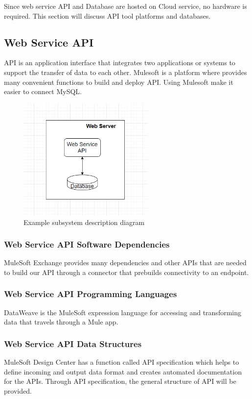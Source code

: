 Since web service API and  Database are hosted on Cloud service, no hardware is required. This section will discuss API tool platforms and databases.

\subsection{Web Service API}
API is an application interface that integrates two applications or systems to support the transfer of data to each other. Mulesoft is a platform where provides many convenient functions to build and deploy API. Using Mulesoft make it easier to connect MySQL.

\begin{figure}[h!]
	\centering
 	\includegraphics[width=0.60\textwidth]{images/web_layer.PNG}
 \caption{Example subsystem description diagram}
\end{figure}

\subsubsection{Web Service API Software Dependencies}
MuleSoft Exchange provides many dependencies and other APIs that are needed to build our API through a connector that prebuilds connectivity to an endpoint. 

\subsubsection{Web Service API Programming Languages}
DataWeave is the MuleSoft expression language for accessing and transforming data that travels through a Mule app. 

\subsubsection{Web Service API Data Structures}
MuleSoft Design Center has a function called API specification which helps to define incoming and output data format and creates automated documentation for the APIs. Through API specification, the general structure of API will be provided.

